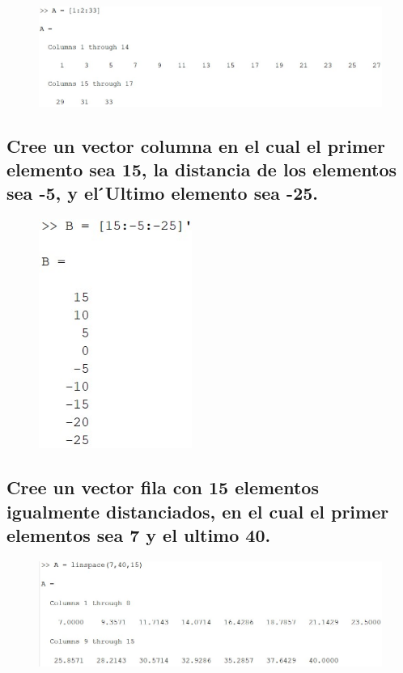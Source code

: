\documentclass{article}
\begin{document}
\begin{figure}[H]
    \centering
    \includegraphics[width = 16cm]{img1.jpg}
\end{figure}

\subsection{Cree un vector columna en el cual el primer elemento sea 15, la distancia de los elementos sea -5, y el  ́Ultimo elemento sea -25.}

\begin{figure}[H]
    \centering
    \includegraphics[width = 5cm]{img2.jpg}
\end{figure}

\subsection{Cree un vector fila con 15 elementos igualmente distanciados, en el cual el primer elementos sea 7 y el ultimo 40.}

\begin{figure}[H]
    \centering
    \includegraphics[width = 16cm]{img3.jpg}
\end{figure}
\end{document}
